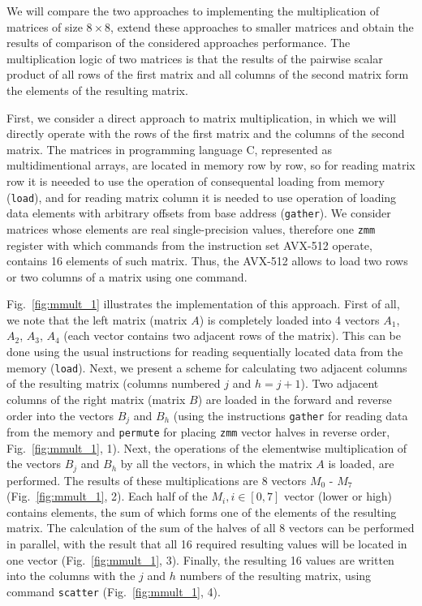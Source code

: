 \documentclass[
11pt,%
tightenlines,%
twoside,%
onecolumn,%
nofloats,%
nobibnotes,%
nofootinbib,%
superscriptaddress,%
noshowpacs,%
centertags]%
{revtex4}
\begin{document}
We will compare the two approaches to implementing the multiplication of matrices of size $8 \times 8$, extend these approaches to smaller matrices and obtain the results of comparison of the considered approaches performance.
The multiplication logic of two matrices is that the results of the pairwise scalar product of all rows of the first matrix and all columns of the second matrix form the elements of the resulting matrix.

First, we consider a direct approach to matrix multiplication, in which we will directly operate with the rows of the first matrix and the columns of the second matrix.
The matrices in programming language C, represented as multidimentional arrays, are located in memory row by row, so for reading matrix row it is neeeded to use the operation of consequental loading from memory (\texttt{load}), and for reading matrix column it is needed to use operation of loading data elements with arbitrary offsets from base address (\texttt{gather}).
We consider matrices whose elements are real single-precision values, therefore one \texttt{zmm} register with which commands from the instruction set AVX-512 operate, contains 16 elements of such matrix.
Thus, the AVX-512 allows to load two rows or two columns of a matrix using one command.

Fig.~\ref{fig:mmult_1} illustrates the implementation of this approach.
First of all, we note that the left matrix (matrix $A$) is completely loaded into 4 vectors $A_1$, $A_2$, $A_3$, $A_4$ (each vector contains two adjacent rows of the matrix).
This can be done using the usual instructions for reading sequentially located data from the memory (\texttt{load}).
Next, we present a scheme for calculating two adjacent columns of the resulting matrix (columns numbered $j$ and $h = j + 1$).
Two adjacent columns of the right matrix (matrix $B$) are loaded in the forward and reverse order into the vectors $B_j$ and $B_h$ (using the instructions \texttt{gather} for reading data from the memory and \texttt{permute} for placing \texttt{zmm} vector halves in reverse order, Fig.~\ref{fig:mmult_1}, 1).
Next, the operations of the elementwise multiplication of the vectors $B_j$ and $B_h$ by all the vectors, in which the matrix $A$ is loaded, are performed.
The results of these multiplications are 8 vectors $M_0$ - $M_7$ (Fig.~\ref{fig:mmult_1}, 2).
Each half of the $M_i, i \in [0, 7]$ vector (lower or high) contains elements, the sum of which forms one of the elements of the resulting matrix.
The calculation of the sum of the halves of all 8 vectors can be performed in parallel, with the result that all 16 required resulting values will be located in one vector (Fig.~\ref{fig:mmult_1}, 3).
Finally, the resulting 16 values are written into the columns with the $j$ and $h$ numbers of the resulting matrix, using command \texttt{scatter} (Fig.~\ref{fig:mmult_1}, 4).
\end{document}
